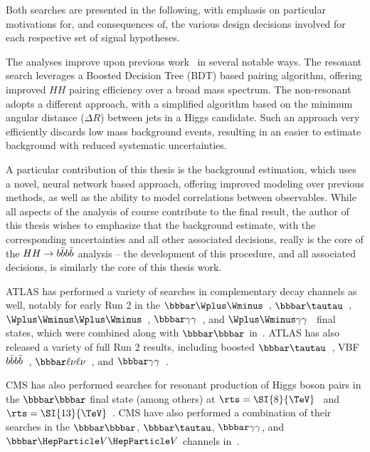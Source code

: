 Both searches are presented in the following, with emphasis on particular motivations for, and consequences
of, the various design decisions involved for each respective set of signal hypotheses. 

The analyses improve upon previous work~\cite{EXOT-2016-31} in several notable ways. The resonant search leverages 
a Boosted Decision Tree (BDT) based pairing algorithm, offering improved $HH$ pairing efficiency over a broad 
mass spectrum. The non-resonant adopts a different approach, with a simplified algorithm based on the minimum
angular distance ($\Delta R$) between jets in a Higgs candidate. Such an approach very efficiently discards 
low mass background events, resulting in an easier to estimate background with reduced systematic uncertainties.

A particular contribution of this thesis is the background estimation, which uses a novel, neural network
based approach, offering improved modeling over previous methods, as well as the ability to model correlations 
between observables. While all aspects of the analysis of course contribute to the final result, the author of this 
thesis wishes to emphasize that the background estimate, with the corresponding uncertainties and all 
other associated decisions, really is the core of the $HH\rightarrow b\bar{b}b\bar{b}$ analysis -- the development
of this procedure, and all associated decisions, is similarly the core of this thesis work.

ATLAS has performed a variety of searches in complementary decay channels as well,
notably for early Run 2 in the $\bbbar\Wplus\Wminus$~\cite{HIGG-2016-27},
$\bbbar\tautau$~\cite{HIGG-2016-16},
$\Wplus\Wminus\Wplus\Wminus$~\cite{HIGG-2016-24},
$\bbbar\gamma\gamma$~\cite{HIGG-2016-15}, and
$\Wplus\Wminus\gamma\gamma$~\cite{HIGG-2016-20} final states, which were combined
along with $\bbbar\bbbar$ in~\cite{HDBS-2018-58}. ATLAS has also released 
a variety of full Run 2 results, including boosted $\bbbar\tautau$~\cite{HDBS-2019-22}, 
VBF $b\bar{b}b\bar{b}$~\cite{HDBS-2018-18}, $\bbbar\ell\nu\ell\nu$~\cite{HDBS-2018-33}, and 
$\bbbar\gamma\gamma$~\cite{ATLAS-CONF-2021-016}.

CMS has also performed searches for resonant production of Higgs boson pairs in
the $\bbbar\bbbar$ final state (among others) at
$\rts = \SI{8}{\TeV}$~\cite{CMS-EXO-12-053} and
$\rts = \SI{13}{\TeV}$~\cite{CMS-B2G-17-019}. CMS have also performed a
combination of their searches in the $\bbbar\bbbar$, $\bbbar\tautau$,
$\bbbar\gamma\gamma$, and $\bbbar\VVbos$ channels in~\cite{CMS-HIG-17-030}.

